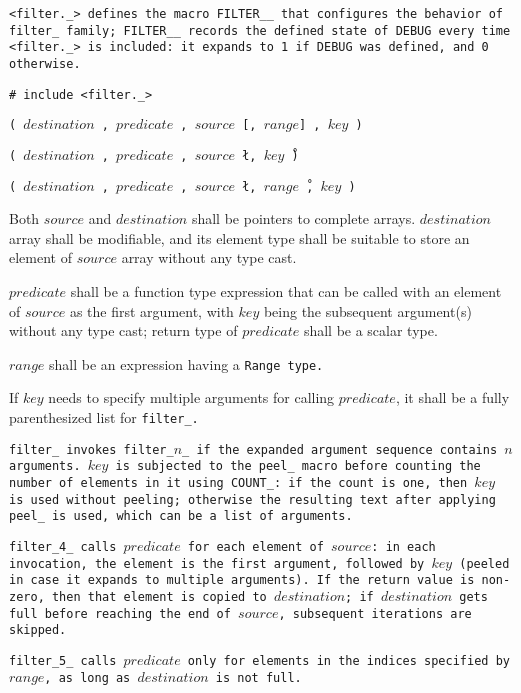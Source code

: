 \tt{<filter._>} defines the macro \tt{FILTER__} that configures the
behavior of \tt{filter_} family;  \tt{FILTER__} records the \tt{defined}
state of \tt{DEBUG} every time \tt{<filter._>} is included:
it expands to \tt{1} if \tt{DEBUG} was defined, and \tt{0} otherwise.


\tt{# include <filter._>}

\s\s\s\tt{(} $destination$ \tt{,}
$predicate$ \tt{,} $source$ [\tt{,} $range$] \tt{,} $key$ \tt{)}

\s\tt{(} $destination$ \tt{,}
$predicate$ \tt{,} $source$ \l\tt{,} $key$\r\ \tt{)}

\s\tt{(} $destination$ \tt{,}
$predicate$ \tt{,} $source$ \l\tt{,} $range$\r\ \tt{,} $key$ \tt{)}


Both $source$ and $destination$ shall be pointers to complete arrays.
$destination$ array shall be modifiable, and its element type shall be
suitable to store an element of $source$ array without any type cast.

$predicate$ shall be a function type expression that can be called with an element
of $source$ as the first argument, with $key$ being the subsequent argument(s)
without any type cast; return type of $predicate$ shall be a scalar type.

$range$ shall be an expression having a \tt{Range} type.

If $key$ needs to specify multiple arguments for calling $predicate$,
it shall be a fully parenthesized list for \tt{filter_}.


\tt{filter_} invokes \tt{filter_}$n$\_ if the
expanded argument sequence contains $n$ arguments.
$key$ is subjected to the \tt{peel_} macro before counting the
number of elements in it using \tt{COUNT_}: if the count is one,
then $key$ is used without peeling; otherwise the resulting text
after applying \tt{peel_} is used, which can be a list of arguments.

\tt{filter_4_} calls $predicate$ for each element of $source$:
in each invocation, the element is the first argument, followed
by $key$ (peeled in case it expands to multiple arguments).
If the return value is non-zero, then that element is copied
to $destination$; if $destination$ gets full before reaching
the end of $source$, subsequent iterations are skipped.

\tt{filter_5_} calls $predicate$ only for elements in the indices
specified by $range$, as long as $destination$ is not full.

\enlargethispage*{\baselineskip}
\pagebreak
